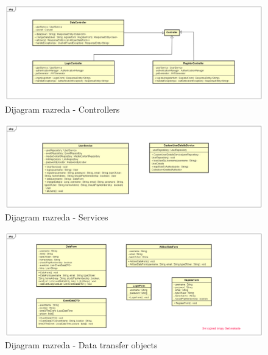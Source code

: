 			\begin{figure}[H]
				\includegraphics[width=\textwidth]{dijagrami/cd3.png} 
				\centering
				\caption{Dijagram razreda - Controllers}
				\label{cd3}
			\end{figure}
			
				\begin{figure}[H]
				\includegraphics[width=\textwidth]{dijagrami/cd5.png} 
				\centering
				\caption{Dijagram razreda - Services}
				\label{cd5}
			\end{figure}
			
			
			\begin{figure}[H]
				\includegraphics[width=\textwidth]{dijagrami/cd4.png} 
				\centering
				\caption{Dijagram razreda - Data transfer objects}
				\label{cd4}
			\end{figure}
			
		
			
			\newpage
			
